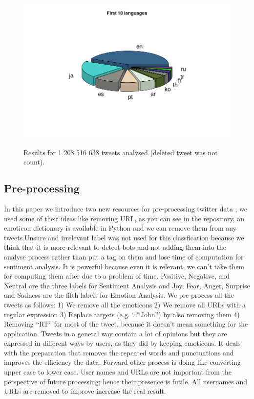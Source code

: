 \documentclass{acmtog} %
\begin{document}
\begin{figure}[h!]
{\includegraphics[width=\linewidth]{first_ten_languages.png}}
\caption{Results for 1 208 516 638 tweets analysed (deleted tweet was not count).}
  \label{fig:trump_results}
\end{figure}


\subsection{Pre-processing}
\label{subsub:preprocessing}

In this paper we introduce two new resources for pre-processing twitter data \cite{Jianqiang17}, we used some of their ideas like removing URL, as you can see in the repository, an emoticon dictionary is available in Python and we can remove them from any tweets.Unsure and irrelevant label was not used for this classfication \citep{Poddar16} because we think that it is more relevant to detect bots and not adding them into the analyse process rather than put a tag on them and lose time of computation for sentiment analysis. It is powerful because even it is relevant, we can’t take them for computing them after due to a problem of time. Positive, Negative, and Neutral are the three labels for Sentiment Analysis and Joy, Fear, Anger, Surprise and Sadness are the fifth labels for Emotion Analysis. We pre-process all the tweets as follows:
1) We remove all the emoticons
2) We remove all URLs with a regular expression 
3) Replace targets (e.g. “@John”) by also removing them
4) Removing “RT” for most of the tweet, because it doesn’t mean something for the application. 
Tweets in a general way contain a lot of opinions but they are expressed in different ways by users, as they did \cite{Rebecca11} by keeping emoticons. It deals with the preparation that removes the repeated words and punctuations and improves the efficiency the data. Forward other process is doing like converting upper case to lower case. User names and URLs are not important from the perspective of future processing; hence their presence is futile. All usernames and URLs are removed to improve increase the real result. 
\end{document}
